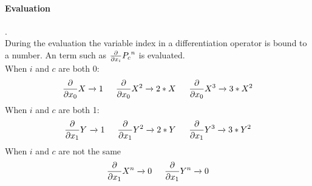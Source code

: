 \documentclass{article}
\begin{document}
\paragraph{Evaluation}.\\
During the evaluation the variable index in a differentiation operator is bound to a number.
An \name{} term such as $\expPolyTermD{P_c}{n}{i}$ is evaluated.\\
When $i$ and $c$ are both 0:\\ 
$$\frac{\partial}{\partial x_0} X \rewriteEINEXP  1 
 \indent  \frac{\partial}{\partial x_0} X^2 \rewriteEINEXP  2*\expPolyTerm{X}{}  
  \indent \frac{\partial}{\partial x_0} X^3  \rewriteEINEXP  3*X^{2} $$ 
When $i$ and $c$ are both 1:\\ 
$$
\expPolyTermD{Y}{}{1} \rewriteEINEXP  1 
 \indent  \expPolyTermD{Y}{2}{1} \rewriteEINEXP  2*\expPolyTerm{Y}{}  
  \indent  \expPolyTermD{Y}{3}{1} \rewriteEINEXP  3*\expPolyTerm{Y}{2}  
   $$  
When $i$ and $c$ are not the same\\ 
$$ \expPolyTermD{X}{n}{1} \rewriteEINEXP  0 
\indent \expPolyTermD{Y}{n}{1} \rewriteEINEXP  0  $$ 


 
\end{document}
